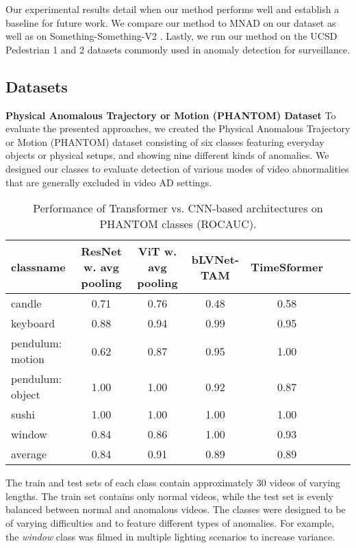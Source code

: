 \documentclass{article}
\begin{document}
\label{sec:experiments}
Our experimental results detail when our method performs well and establish a baseline for future work. We compare our method to MNAD on our dataset as well as on Something-Something-V2 \cite{goyal2017something}. Lastly, we run our method on the UCSD Pedestrian 1 and 2 \cite{mahadevan2010anomaly} datasets commonly used in anomaly detection for surveillance.

\subsection{Datasets}

\label{sec:datasets}

\textbf{Physical Anomalous Trajectory or Motion (PHANTOM) Dataset}
To evaluate the presented approaches, we created the Physical Anomalous Trajectory or Motion (PHANTOM) dataset consisting of six classes featuring everyday objects or physical setups, and showing nine different kinds of anomalies. We designed our classes to evaluate detection of various modes of video abnormalities that are generally excluded in video AD settings.  

\begin{table*}[ht!]
  \centering
  \label{tab:transformers_eval}

    \begin{tabular}{lcccccc}
    \toprule      


	classname	&	ResNet w. avg pooling	&	ViT	w. avg pooling &	bLVNet-TAM 
 	&	TimeSformer \\
\midrule										
	candle	&	0.71	&	0.76	&	0.48	&	0.58	\\
	keyboard	&	0.88	&	0.94	&	0.99	&	0.95	\\
	pendulum: motion	&	0.62	&	0.87	&	0.95	&	1.00	\\
	pendulum: object	&	1.00	&	1.00	&	0.92	&	0.87	\\
	sushi	&	1.00	&	1.00	&	1.00	&	1.00	\\
	window	&	0.84	&	0.86	&	1.00	&	0.93	\\
\midrule										
	average	&	0.84	&	0.91	&	0.89	&	0.89	\\
	 \bottomrule
    \end{tabular}
    \caption{Performance of Transformer vs. CNN-based architectures on PHANTOM classes (ROCAUC). }
\end{table*}

The train and test sets of each class contain approximately 30 videos of varying lengths. The train set contains only normal videos, while the test set is evenly balanced between normal and anomalous videos. The classes were designed to be of varying difficulties and to feature different types of anomalies. For example, the \textit{window} class was filmed in multiple lighting scenarios to increase variance.
\end{document}
